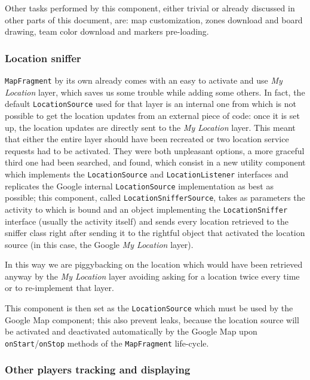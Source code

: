 			Other tasks performed by this component, either trivial or already discussed in other parts of this document, are: map customization, zones download and board drawing, team color download and markers pre-loading.
			
			\newpage
			
			\subsubsection{Location sniffer}
			
			\lstinline|MapFragment| by its own already comes with an easy to activate and use \emph{My Location} layer, which saves us some trouble while adding some others.
			In fact, the default \lstinline|LocationSource| used for that layer is an internal one from which is not possible to get the location updates from an external piece of code: once it is set up, the location updates are directly sent to the \emph{My Location} layer.
			This meant that either the entire layer should have been recreated or two location service requests had to be activated. They were both unpleasant options, a more graceful third one had been searched, and found, which consist in a new utility component which implements the \lstinline|LocationSource| and \lstinline|LocationListener| interfaces and replicates the Google internal \lstinline|LocationSource| implementation as best as possible; this component, called \lstinline|LocationSnifferSource|, takes as parameters the activity to which is bound and an object implementing the \lstinline|LocationSniffer| interface (usually the activity itself) and sends every location retrieved to the sniffer class right after sending it to the rightful object that activated the location source (in this case, the Google \emph{My Location} layer).
			
			In this way we are piggybacking on the location which would have been retrieved anyway by the \emph{My Location} layer avoiding asking for a location twice every time or to re-implement that layer.
			
			This component is then set as the \lstinline|LocationSource| which must be used by the Google Map component; this also prevent leaks, because the location source will be activated and deactivated automatically by the Google Map upon \lstinline|onStart|/\lstinline|onStop| methods of the \lstinline|MapFragment| life-cycle.
			
			\subsubsection{Other players tracking and displaying}
			

